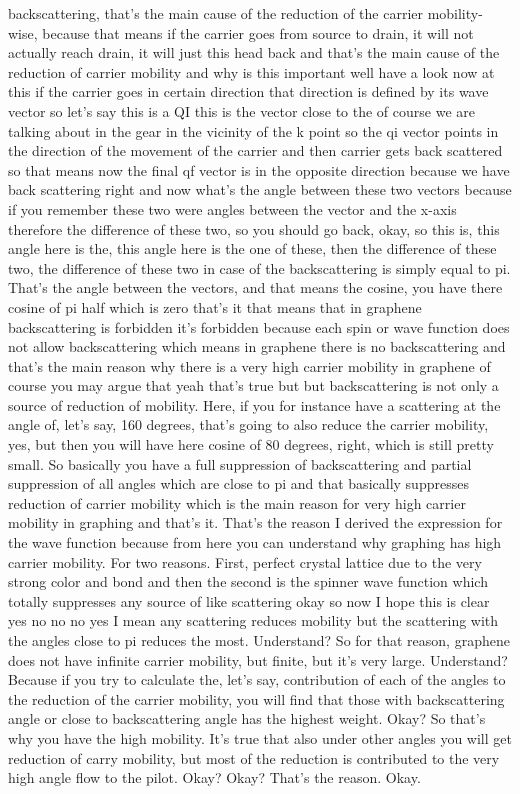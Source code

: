 backscattering, that's the main cause of the reduction of the carrier mobility-wise, because that means if the carrier goes from source to drain, it will not actually reach drain, it will just this head back and that's the main cause of the reduction of carrier mobility and why is this important well have a look now at this if the carrier goes in certain direction that direction is defined by its wave vector so let's say this is a QI this is the vector close to the of course we are talking about in the gear in the vicinity of the k point so the qi vector points in the direction of the movement of the carrier and then carrier gets back scattered so that means now the final qf vector is in the opposite direction because we have back scattering right and now what's the angle between these two vectors because if you remember these two were angles between the vector and the x-axis therefore the difference of these two, so you should go back, okay, so this is, this angle here is the, this angle here is the one of these, then the difference of these two, the difference of these two in case of the backscattering is simply equal to pi. That's the angle between the vectors, and that means the cosine, you have there cosine of pi half which is zero that's it that means that in graphene backscattering is forbidden it's forbidden because each spin or wave function does not allow backscattering which means in graphene there is no backscattering and that's the main reason why there is a very high carrier mobility in graphene of course you may argue that yeah that's true but but backscattering is not only a source of reduction of mobility. Here, if you for instance have a scattering at the angle of, let's say, 160 degrees, that's going to also reduce the carrier mobility, yes, but then you will have here cosine of 80 degrees, right, which is still pretty small. So basically you have a full suppression of backscattering and partial suppression of all angles which are close to pi and that basically suppresses reduction of carrier mobility which is the main reason for very high carrier mobility in graphing and that's it. That's the reason I derived the expression for the wave function because from here you can understand why graphing has high carrier mobility. For two reasons. First, perfect crystal lattice due to the very strong color and bond and then the second is the spinner wave function which totally suppresses any source of like scattering okay so now I hope this is clear yes no no no yes I mean any scattering reduces mobility but the scattering with the angles close to pi reduces the most. Understand? So for that reason, graphene does not have infinite carrier mobility, but finite, but it's very large. Understand? Because if you try to calculate the, let's say, contribution of each of the angles to the reduction of the carrier mobility, you will find that those with backscattering angle or close to backscattering angle has the highest weight. Okay? So that's why you have the high mobility. It's true that also under other angles you will get reduction of carry mobility, but most of the reduction is contributed to the very high angle flow to the pilot. Okay? Okay? That's the reason. Okay.
